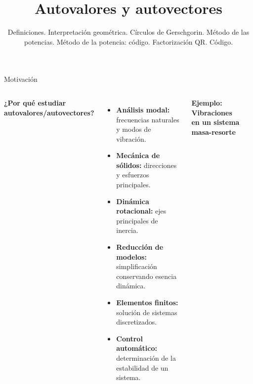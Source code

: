 \documentclass[9pt, aspectratio=169]{beamer}
\title{Autovalores y autovectores}
\subtitle{Definiciones. Interpretación geométrica. Círculos de Gerschgorin. Método de las potencias. Método de la potencia: código. Factorización QR. Código.}
\begin{document}
\maketitle

\begin{frame}{Motivación}

	\begin{columns}[c]
		\textbf{¿Por qué estudiar autovalores/autovectores?}
		\begin{itemize}
			\item \textbf{Análisis modal:} frecuencias naturales y modos de vibración.
			\item \textbf{Mecánica de sólidos:} direcciones y esfuerzos principales.
			\item \textbf{Dinámica rotacional:} ejes principales de inercia.
			\item \textbf{Reducción de modelos:} simplificación conservando esencia dinámica.
			\item \textbf{Elementos finitos:} solución de sistemas discretizados.
			\item \textbf{Control automático:} determinación de la estabilidad de un sistema.
		\end{itemize}


		\textbf{Ejemplo: Vibraciones en un sistema masa-resorte}

		\begin{center}
\end{center}
\end{columns}
\end{frame}
\end{document}
